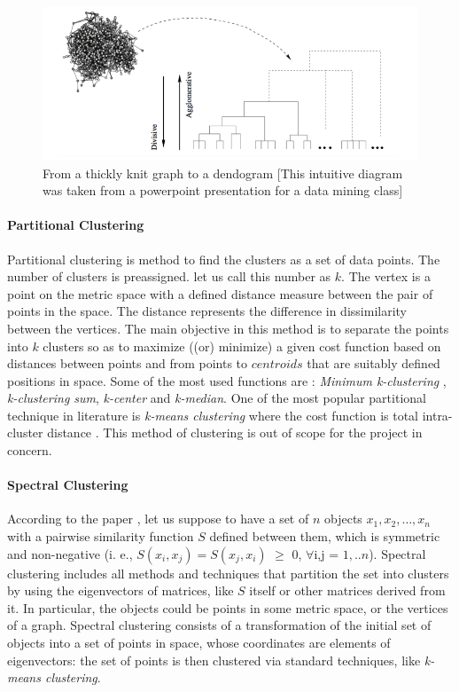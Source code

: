 \begin{figure}[H]
\centering
\includegraphics[scale=0.5]{hirac.png}
\caption{\label{herar}From a thickly knit graph to a dendogram [This intuitive diagram was taken from a powerpoint presentation for a data mining class]}
\end{figure}
\paragraph{Partitional Clustering}
Partitional clustering is method to find the clusters as a set of data points.  The number of clusters is preassigned. let us call this number as $k$. The vertex is a point on the metric space with a defined distance measure between the pair of points in the space.  The distance represents the difference in dissimilarity between the vertices. The main objective in this method is to separate the points into $k$ clusters so as to maximize ((or) minimize) a given cost function based on distances between points and from points to $centroids$ that are suitably defined positions in space. 
Some of the most used functions are : \textit{Minimum k-clustering} ,  \textit{k-clustering sum}, \textit{k-center} and \textit{k-median}. One of the most popular partitional technique in literature is \textit{k-means clustering} where the cost function is total intra-cluster distance \cite{communitypaper}. This method of clustering is out of scope for the project in concern.
\paragraph{Spectral Clustering}
According to the paper \cite{communitypaper}, let us suppose to have a set of $n$ objects $x_1 , x_2 , \ldots , x_n$
with a pairwise similarity function $S$ defined between
them, which is symmetric and non-negative (i. e.,
$S(x_i , x_j) = S(x_j , x_i)$ $\geq$ 0, $\forall$i,j = $1, ..n$). Spectral clustering includes all methods and techniques that partition
the set into clusters by using the eigenvectors of matrices,
like $S$ itself or other matrices derived from it. In particular, the objects could be points in some metric space,
or the vertices of a graph. Spectral clustering consists of
a transformation of the initial set of objects into a set of
points in space, whose coordinates are elements of eigenvectors: the set of points is then clustered via standard
techniques, like \textit{k-means clustering}.


